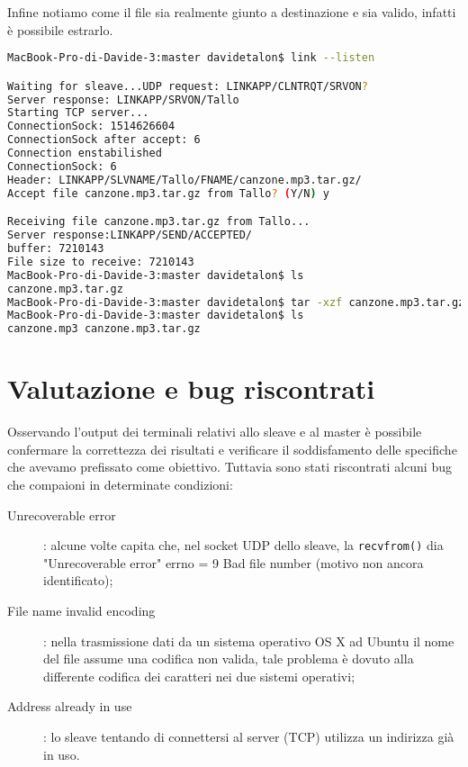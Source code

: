 \documentclass[11pt,fleqn]{book} %
\begin{document}
Infine notiamo come il file sia realmente giunto a destinazione e sia valido, infatti è possibile estrarlo.

\begin{lstlisting}[language=Bash]
MacBook-Pro-di-Davide-3:master davidetalon$ link --listen

Waiting for sleave...UDP request: LINKAPP/CLNTRQT/SRVON?
Server response: LINKAPP/SRVON/Tallo
Starting TCP server...
ConnectionSock: 1514626604
ConnectionSock after accept: 6
Connection enstabilished
ConnectionSock: 6
Header: LINKAPP/SLVNAME/Tallo/FNAME/canzone.mp3.tar.gz/
Accept file canzone.mp3.tar.gz from Tallo? (Y/N) y

Receiving file canzone.mp3.tar.gz from Tallo...
Server response:LINKAPP/SEND/ACCEPTED/
buffer: 7210143
File size to receive: 7210143
MacBook-Pro-di-Davide-3:master davidetalon$ ls
canzone.mp3.tar.gz
MacBook-Pro-di-Davide-3:master davidetalon$ tar -xzf canzone.mp3.tar.gz
MacBook-Pro-di-Davide-3:master davidetalon$ ls
canzone.mp3 canzone.mp3.tar.gz
\end{lstlisting}


\section{Valutazione e bug riscontrati}
Osservando l'output dei terminali relativi allo sleave e al master è possibile confermare la correttezza dei risultati e verificare il soddisfamento delle specifiche che avevamo prefissato come obiettivo. Tuttavia sono stati riscontrati alcuni bug che compaioni in determinate condizioni:
\medskip
\begin{description}
	\item[Unrecoverable error]: alcune volte capita che, nel socket UDP dello sleave, la \texttt{recvfrom()} dia "Unrecoverable error" errno = 9 Bad 		file number (motivo non ancora identificato);
	\item[File name invalid encoding]: nella trasmissione dati da un sistema operativo OS X ad Ubuntu il nome del file assume una codifica non 			valida, tale problema è dovuto alla differente codifica dei caratteri nei due sistemi operativi;
	\item[Address already in use]: lo sleave tentando di connettersi al server (TCP) utilizza un indirizza già in uso. 
\end{description}




\end{document}
